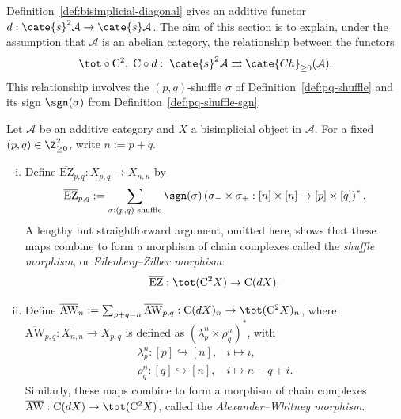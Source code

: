 
Definition~\ref{def:bisimplicial-diagonal} gives an additive functor
$d:\cate{s}^2\mathcal{A}\to\cate{s}\mathcal{A}$. The aim of this section is
to explain, under the assumption that $\mathcal{A}$ is an abelian category,
the relationship between the functors
\[ \tot \circ \mathrm{C}^2 , \; \mathrm{C} \circ d: \; \cate{s}^2 \mathcal{A} \rightrightarrows \cate{Ch}_{\geq 0}(\mathcal{A}). \]
This relationship involves the $(p,q)$-shuffle $\sigma$ of
Definition~\ref{def:pq-shuffle} and its sign $\sgn(\sigma)$ from
Definition~\ref{def:pq-shuffle-sgn}.

\begin{definition}\label{def:Eilenberg-Zilber}
	Let $\mathcal{A}$ be an additive category and $X$ a bisimplicial object
	in $\mathcal{A}$. For a fixed $(p,q)\in\Z_{\geq0}^2$, write $n:=p+q$.
	\begin{enumerate}[(i)]
		\item Define $\overline{\mathrm{EZ}}_{p,q}:X_{p,q}\to X_{n,n}$ by
		\[ \overline{\mathrm{EZ}}_{p, q} := \sum_{\sigma: (p,q)\text{-shuffle}}
			\sgn(\sigma) \left( \sigma_- \times \sigma_+ : [n] \times [n] \to [p] \times [q] \right)^*. \]
		A lengthy but straightforward argument, omitted here, shows that these
		maps combine to form a morphism of chain complexes called the
		\emph{shuffle morphism}, or \emph{Eilenberg--Zilber morphism}:
		\[ \overline{\mathrm{EZ}}: \tot(\mathrm{C}^2 X) \to \mathrm{C}(dX). \]
		\item Define
		$\overline{\mathrm{AW}}_n:=\sum_{p+q=n}\overline{\mathrm{AW}}_{p,q}:
		\mathrm{C}(dX)_n\to\tot(\mathrm{C}^2X)_n$, where
		$\overline{\mathrm{AW}}_{p,q}:X_{n,n}\to X_{p,q}$ is defined as
		$(\lambda^n_p\times\rho^n_q)^*$, with
		\[\begin{array}{rl}
			\lambda^n_p: [p] \hookrightarrow [n], & i \mapsto i, \\
			\rho^n_q: [q] \hookrightarrow [n], & i \mapsto n - q + i.
		\end{array}\]
		Similarly, these maps combine to form a morphism of chain complexes
		$\overline{\mathrm{AW}}:\mathrm{C}(dX)\to\tot(\mathrm{C}^2X)$,
		called the \emph{Alexander--Whitney morphism}.
	\end{enumerate}
\end{definition}

